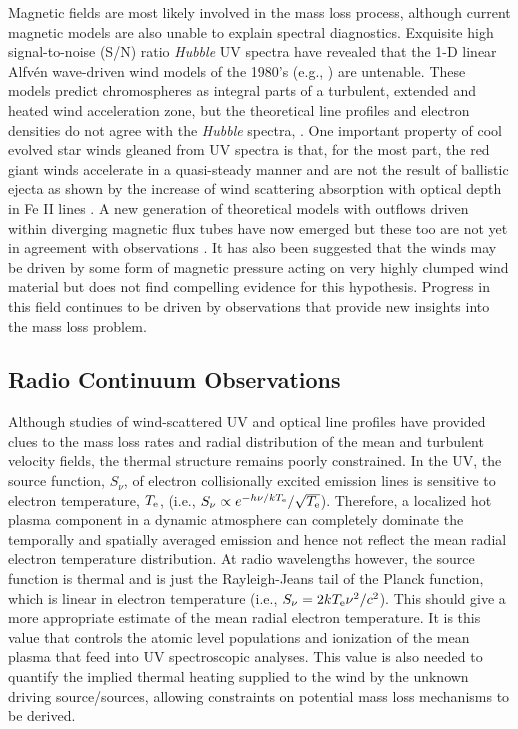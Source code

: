 \documentclass[iop]{emulateapj}
\begin{document}
Magnetic fields are most likely involved in the mass loss process, although current magnetic models are also unable to explain spectral diagnostics. Exquisite high signal-to-noise (S/N) ratio \textit{Hubble} UV spectra have revealed that the 1-D linear Alfv\'en wave-driven wind models of the 1980’s (e.g., \citealt{1980ApJ...242..260H,1988PhDT........13H}) are untenable. These models predict chromospheres as integral parts of a turbulent, extended and heated wind acceleration zone, but the theoretical line profiles and electron densities do not agree with the \textit{Hubble} spectra, \cite[e.g.,][]{1998ApJ...494..828J}. One important property of cool evolved star winds gleaned from UV spectra is that, for the most part, the red giant winds accelerate in a quasi-steady manner and are not the result of ballistic ejecta as shown by the increase of wind scattering absorption with optical depth in Fe II lines \citep{1999ApJ...521..382C}. A new generation of theoretical models with outflows driven within diverging magnetic flux tubes have now emerged \citep{2006MNRAS.368.1145F, 2007ApJ...659.1592S} but these too are not yet in agreement with observations \citep{2009AIPC.1094..267C}. It has also been suggested that the winds may be driven by some form of magnetic pressure acting on very highly clumped wind material \citep{2008AJ....136.1964E} but \cite{2010ApJ...720.1767H} does not find compelling evidence for this hypothesis. Progress in this field continues to be driven by observations that provide new insights into the mass loss problem.

\subsection{Radio Continuum Observations} \label{intro1} 

Although studies of wind-scattered UV and optical line profiles have provided clues to the mass loss rates and radial distribution of the mean and turbulent velocity fields, the thermal structure remains poorly constrained. In the UV, the source function, $S_{\nu}$, of electron collisionally excited emission lines is sensitive to electron temperature, $T_{\rm{e}}$, (i.e., $S_{\nu} \propto e^{-h\nu /kT_{\rm{e}}}/\sqrt{T_{\rm{e}}}$). Therefore, a localized hot plasma component in a dynamic atmosphere can completely dominate the temporally and spatially averaged emission and hence not reflect the mean radial electron temperature distribution. At radio wavelengths however, the source function is thermal and is just the Rayleigh-Jeans tail of the Planck function, which is linear in electron temperature (i.e., $S_{\nu} = {2kT_{\rm{e}}\nu ^2 /c^2}$). This should give a more appropriate estimate of the mean radial electron temperature. It is this value that controls the atomic level populations and ionization of the mean plasma that feed into UV spectroscopic analyses. This value is also needed to quantify the implied thermal heating supplied to the  wind by the unknown driving source/sources, allowing constraints on potential mass loss mechanisms to be derived.
\end{document}
